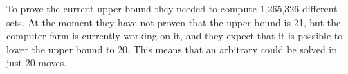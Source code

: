 To prove the current upper bound they needed to compute 1,265,326 different sets. 
At the moment they have not proven that the upper bound is 21, but the computer farm is currently working on it, and they expect that it is possible to lower the upper bound to 20. 
This means that an arbitrary \rubik{} could be solved in just 20 moves.


\begin{comment}
The progression greatly accelerated when that set solver proved the first upper bound of 25 moves. This was done on home computers from October 2007 to March 2008. They only needed to solve 6000 sets, but after this they got contacted by John Welborn from Sony Pictures Imageworks and he offered a lot of idle computers from a computer farm to help on the project. 
\end{comment}
\begin{comment}

The set solver created by Thomas Rockicki, which was described in the previous section will now be further described.


The set solver has a special way of testing the \rubik{}s. It does not solve them to the unit position $e$, instead it finds a move sequence for a subgroup of the \rubik{} this way it can solve approximately 19.5 billion cubes at a time and not just one. The reason for this is that if you relabel an arbitrary cube, that given cube can be unlabeled to approximately 19.5 billion different cube positions. Recall that there are approximately 19.5 billion positions in the set \m{H} and all these positions are equal to $e$ when relabeled. The same logic applies to any other given position.
\end{comment}